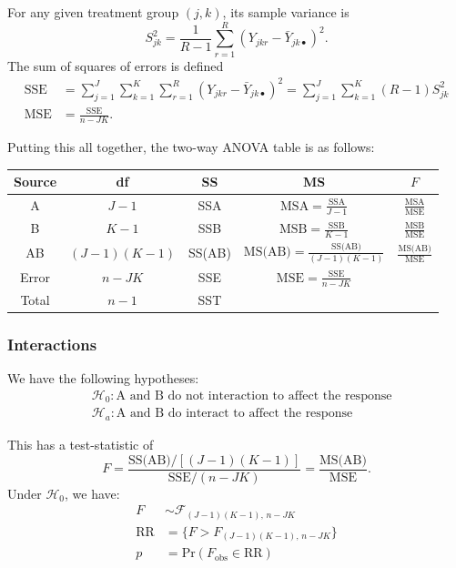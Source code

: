 \documentclass[12pt]{article}
\begin{document}
For any given treatment group $(j,k)$, its sample variance is \[S_{jk}^2 = \frac{1}{R-1}\sum_{r=1}^R(Y_{jkr}-\bar{Y}_{jk\bullet})^2.\] The sum of squares of errors is defined \begin{align*}
    \text{SSE} &= \sum_{j=1}^J \sum_{k=1}^K \sum_{r=1}^R (Y_{jkr} - \bar{Y}_{jk\bullet})^2 = \sum_{j=1}^J \sum_{k=1}^K (R-1)S_{jk}^2\\
    \text{MSE} &= \frac{\text{SSE}}{n - JK}.
\end{align*}

Putting this all together, the two-way ANOVA table is as follows:
\begin{center}
    \begin{tabular}{c c c c c}
        Source & df & SS & MS & $F$\\
        \hline
        A & $J-1$ & SSA & $\text{MSA} = \frac{\text{SSA}}{J-1}$ & $\frac{\text{MSA}}{\text{MSE}}$\\
        B & $K-1$ & SSB & $\text{MSB} = \frac{\text{SSB}}{K-1}$ & $\frac{\text{MSB}}{\text{MSE}}$\\
        AB & $(J-1)(K-1)$ & SS(AB) & $\text{MS(AB)} = \frac{\text{SS(AB)}}{(J-1)(K-1)}$ & $\frac{\text{MS(AB)}}{\text{MSE}}$\\
        Error & $n - JK$ & SSE & $\text{MSE} = \frac{\text{SSE}}{n - JK}$ & \\
        \hline
        Total & $n-1$ & SST & & \\
    \end{tabular}
\end{center}

\subsubsection{Interactions}

We have the following hypotheses: \begin{align*}
    &\mathcal{H}_0: \text{A and B do not interaction to affect the response}\\
    &\mathcal{H}_a: \text{A and B do interact to affect the response}
\end{align*}

This has a test-statistic of \[F = \frac{\text{SS(AB)}/\left[(J-1)(K-1)\right]}{\text{SSE}/(n-JK)} = \frac{\text{MS(AB)}}{\text{MSE}}.\] Under $\mathcal{H}_0$, we have: \begin{align*}
    F &\sim \mathcal{F}_{(J-1)(K-1),\, n-JK}\\
    \text{RR} &= \{F > F_{(J-1)(K-1),\, n-JK}\}\\
    p &= \text{Pr}(F_{\text{obs}} \in \text{RR})
\end{align*}
\end{document}
